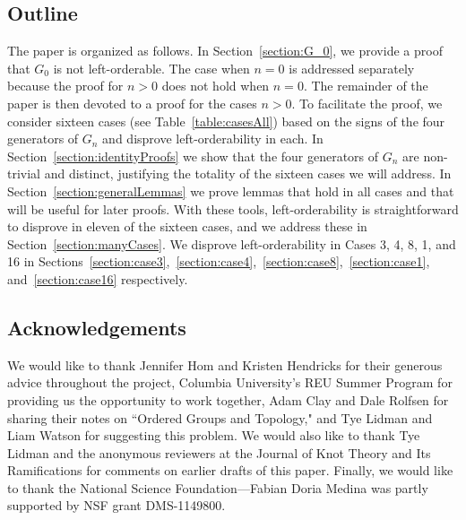 \subsection{Outline}
The paper is organized as follows. In Section~\ref{section:G_0}, we provide a proof that $G_0$ is not left-orderable. The case when $n=0$ is addressed separately because the proof for $n>0$ does not hold when $n=0$. The remainder of the paper is then devoted to a proof for the cases $n>0$. To facilitate the proof, we consider sixteen cases (see Table~\ref{table:casesAll}) based on the signs of the four generators of $G_n$ and disprove left-orderability in each. In Section~\ref{section:identityProofs} we show that the four generators of $G_n$ are non-trivial and distinct, justifying the totality of the sixteen cases we will address. In Section~\ref{section:generalLemmas} we prove lemmas that hold in all cases and that will be useful for later proofs. With these tools, left-orderability is straightforward to disprove in eleven of the sixteen cases, and we address these in Section~\ref{section:manyCases}. We disprove left-orderability in Cases 3, 4, 8, 1, and 16  in Sections~\ref{section:case3},~\ref{section:case4},~\ref{section:case8},~\ref{section:case1}, and~\ref{section:case16} respectively.

\subsection{Acknowledgements} We would like to thank Jennifer Hom and Kristen Hendricks for their generous advice throughout the project, Columbia University's REU Summer Program for providing us the opportunity to work together, Adam Clay and Dale Rolfsen for sharing their notes on ``Ordered Groups and Topology," and Tye Lidman and Liam Watson for suggesting this problem. We would also like to thank Tye Lidman and the anonymous reviewers at the Journal of Knot Theory and Its Ramifications for comments on earlier drafts of this paper. Finally, we would like to thank the National Science Foundation---Fabian Doria Medina was partly supported by NSF grant DMS-1149800.